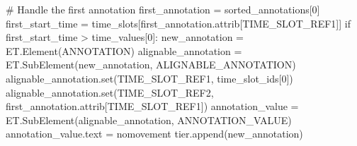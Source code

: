 \documentclass[
  letterpaper,
  DIV=11,
  numbers=noendperiod]{scrreprt}
\newenvironment{Shaded}{\begin{snugshade}}{\end{snugshade}}
\newcommand{\BuiltInTok}[1]{\textcolor[rgb]{0.00,0.23,0.31}{#1}}
\newcommand{\CommentTok}[1]{\textcolor[rgb]{0.37,0.37,0.37}{#1}}
\newcommand{\ControlFlowTok}[1]{\textcolor[rgb]{0.00,0.23,0.31}{#1}}
\newcommand{\DecValTok}[1]{\textcolor[rgb]{0.68,0.00,0.00}{#1}}
\newcommand{\NormalTok}[1]{\textcolor[rgb]{0.00,0.23,0.31}{#1}}
\newcommand{\OperatorTok}[1]{\textcolor[rgb]{0.37,0.37,0.37}{#1}}
\newcommand{\StringTok}[1]{\textcolor[rgb]{0.13,0.47,0.30}{#1}}
\begin{document}
\begin{Shaded}
\begin{Highlighting}[]
            \CommentTok{\# Handle the first annotation}
\NormalTok{            first\_annotation }\OperatorTok{=}\NormalTok{ sorted\_annotations[}\DecValTok{0}\NormalTok{]}
\NormalTok{            first\_start\_time }\OperatorTok{=}\NormalTok{ time\_slots[first\_annotation.attrib[}\StringTok{\textquotesingle{}TIME\_SLOT\_REF1\textquotesingle{}}\NormalTok{]]}
            \ControlFlowTok{if}\NormalTok{ first\_start\_time }\OperatorTok{\textgreater{}}\NormalTok{ time\_values[}\DecValTok{0}\NormalTok{]:}
\NormalTok{                new\_annotation }\OperatorTok{=}\NormalTok{ ET.Element(}\StringTok{\textquotesingle{}ANNOTATION\textquotesingle{}}\NormalTok{)}
\NormalTok{                alignable\_annotation }\OperatorTok{=}\NormalTok{ ET.SubElement(new\_annotation, }\StringTok{\textquotesingle{}ALIGNABLE\_ANNOTATION\textquotesingle{}}\NormalTok{)}
\NormalTok{                alignable\_annotation.}\BuiltInTok{set}\NormalTok{(}\StringTok{\textquotesingle{}TIME\_SLOT\_REF1\textquotesingle{}}\NormalTok{, time\_slot\_ids[}\DecValTok{0}\NormalTok{])}
\NormalTok{                alignable\_annotation.}\BuiltInTok{set}\NormalTok{(}\StringTok{\textquotesingle{}TIME\_SLOT\_REF2\textquotesingle{}}\NormalTok{, first\_annotation.attrib[}\StringTok{\textquotesingle{}TIME\_SLOT\_REF1\textquotesingle{}}\NormalTok{])}
\NormalTok{                annotation\_value }\OperatorTok{=}\NormalTok{ ET.SubElement(alignable\_annotation, }\StringTok{\textquotesingle{}ANNOTATION\_VALUE\textquotesingle{}}\NormalTok{)}
\NormalTok{                annotation\_value.text }\OperatorTok{=} \StringTok{\textquotesingle{}nomovement\textquotesingle{}}
\NormalTok{                tier.append(new\_annotation)}


\end{Highlighting}
\end{Shaded}
\end{document}
